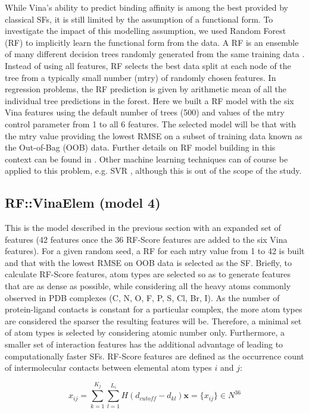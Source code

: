 While Vina's ability to predict binding affinity is among the best provided by classical SFs, it is still limited by the assumption of a functional form. To investigate the impact of this modelling assumption, we used Random Forest (RF) to implicitly learn the functional form from the data. A RF is an ensemble of many different decision trees randomly generated from the same training data \citep{1309}. Instead of using all features, RF selects the best data split at each node of the tree from a typically small number (mtry) of randomly chosen features. In regression problems, the RF prediction is given by arithmetic mean of all the individual tree predictions in the forest. Here we built a RF model with the six Vina features using the default number of trees (500) and values of the mtry control parameter from 1 to all 6 features. The selected model will be that with the mtry value providing the lowest RMSE on a subset of training data known as the Out-of-Bag (OOB) data. Further details on RF model building in this context can be found in \citep{564}. Other machine learning techniques can of course be applied to this problem, e.g. SVR \citep{1295}, although this is out of the scope of the study.

\subsection{RF::VinaElem (model 4)}

This is the model described in the previous section with an expanded set of features (42 features once the 36 RF-Score features are added to the six Vina features). For a given random seed, a RF for each mtry value from 1 to 42 is built and that with the lowest RMSE on OOB data is selected as the SF. Briefly, to calculate RF-Score features, atom types are selected so as to generate features that are as dense as possible, while considering all the heavy atoms commonly observed in PDB complexes (C, N, O, F, P, S, Cl, Br, I). As the number of protein-ligand contacts is constant for a particular complex, the more atom types are considered the sparser the resulting features will be. Therefore, a minimal set of atom types is selected by considering atomic number only. Furthermore, a smaller set of interaction features has the additional advantage of leading to computationally faster SFs. RF-Score features are defined as the occurrence count of intermolecular contacts between elemental atom types $i$ and $j$:

\begin{equation}
\label{rfscore3:x_ij}
x_{ij}=\sum_{k=1}^{K_j}\sum_{l=1}^{L_i}H(d_{cutoff}-d_{kl})   \mathbf x=\{x_{ij}\}\in N^36
\end{equation}

